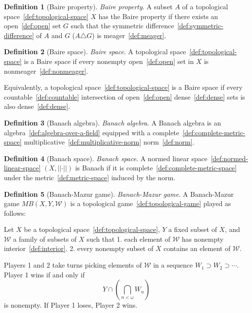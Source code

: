 \documentclass[12pt,a4paper]{article}
\theoremstyle{definition}
\newtheorem{definition}{Definition}
\begin{document}
\begin{definition}[Baire property]\label{def:baire-property}
\emph{Baire property}. A subset $A$ of a topological space~\ref{def:topological-space} $X$ has the Baire property if there exists an open~\ref{def:open} set $G$ such that the symmetric difference~\ref{def:symmetric-difference} of $A$ and $G$ ($A \triangle G$) is meager~\ref{def:meager}.
\end{definition}

\begin{definition}[Baire space]\label{def:baire-space}
\emph{Baire space}. A topological space~\ref{def:topological-space} is a Baire space if every nonempty open~\ref{def:open} set in $X$ is nonmeager~\ref{def:nonmeager}.

Equivalently, a topological space~\ref{def:topological-space} is a Baire space if every countable~\ref{def:countable} intersection of open~\ref{def:open} dense~\ref{def:dense} sets is also dense~\ref{def:dense}.
\end{definition}

\begin{definition}[Banach algebra]\label{def:banach-algebra}
\emph{Banach algebra}. A Banach algebra is an algebra~\ref{def:algebra-over-a-field} equipped with a complete~\ref{def:complete-metric-space} multiplicative~\ref{def:multiplicative-norm} norm~\ref{def:norm}.
\end{definition}

\begin{definition}[Banach space]\label{def:banach-space}
\emph{Banach space}. A normed linear space~\ref{def:normed-linear-space} $(X, \vert \vert \cdot\vert \vert )$ is Banach if it is complete~\ref{def:complete-metric-space} under the metric~\ref{def:metric-space} induced by the norm.
\end{definition}

\begin{definition}[Banach-Mazur game]\label{def:banach-mazur-game}
\emph{Banach-Mazur game}. A Banach-Mazur game $MB(X,Y, \mathcal W)$ is a topological game~\ref{def:topological-game} played as follows:

Let $X$ be a topological space~\ref{def:topological-space}, $Y$ a fixed subset of $X$, and $\mathcal W$ a family of subsets of $X$ such that
1. each element of $\mathcal W$ has nonempty interior~\ref{def:interior}.
2. every nonempty subset of $X$ contains an element of $\mathcal W$. 

Players 1 and 2 take turns picking elements of $\mathcal W$ in a sequence $W_1\supset W_2\supset\cdots$. Player 1 wins if and only if $$
Y\cap \left(\bigcap_{n<\omega} W_n\right)$$ is nonempty. If Player 1 loses, Player 2 wins.
\end{definition}
\end{document}
